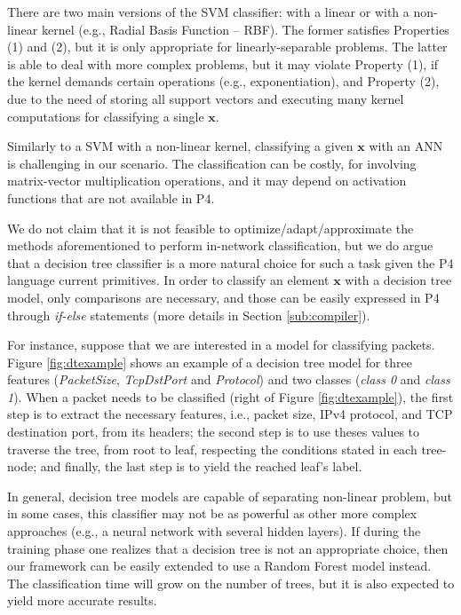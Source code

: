 There are two main versions of the SVM classifier: with a linear or with a non-linear kernel (e.g., Radial Basis Function -- RBF). The former satisfies Properties (1) and (2), but it is only appropriate for linearly-separable problems. The latter is able to deal with more complex problems, but it may violate Property (1), if the kernel demands certain operations (e.g., exponentiation), and Property (2), due to the need of storing all support vectors and executing many kernel computations for classifying a single $\mathbf{x}$.

Similarly to a SVM with a non-linear kernel, classifying a given $\mathbf{x}$ with an ANN is challenging in our scenario. The classification can be costly, for involving matrix-vector multiplication operations, and it may depend on activation functions that are not available in P4.


We do not claim that it is not feasible to optimize/adapt/approximate the methods aforementioned to perform in-network classification, but we do argue that a decision tree classifier is a more natural choice for such a task given the P4 language current primitives.
In order to classify an element $\mathbf{x}$ with a decision tree model, only comparisons are necessary, and those can be easily expressed in P4 through \emph{if-else} statements (more details in Section \ref{sub:compiler}).



For instance, suppose that we are interested in a model for classifying packets. Figure \ref{fig:dtexample} shows an example of a decision tree model for three features (\emph{PacketSize}, \emph{TcpDstPort} and \emph{Protocol}) and two classes (\emph{class 0} and \emph{class 1}). When a packet needs to be classified (right of Figure \ref{fig:dtexample}), the first step is to extract the necessary features, i.e., packet size, IPv4 protocol, and TCP destination port, from its headers; the second step is to use theses values to traverse the tree, from root to leaf, respecting the conditions stated in each tree-node; and finally, the last step is to yield the reached leaf's label.

In general, decision tree models are capable of separating non-linear problem, but in some cases, this classifier may not be as powerful as other more complex approaches (e.g., a neural network with several hidden layers). If during the training phase one realizes that a decision tree is not an appropriate choice, then our framework can be easily extended to use a Random Forest model instead. The classification time will grow on the number of trees, but it is also expected to yield more accurate results.


